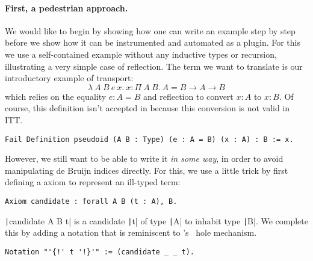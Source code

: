 \paragraph{First, a pedestrian approach.}
%
We would like to begin by showing how one can write an example step by step
before we show how it can be instrumented and automated as a plugin.
For this we use a self-contained example without any inductive
types or recursion, illustrating a very simple case of reflection.
The term we want to translate is our introductory example of transport:
\[
  \lambda\ A\ B\ e\ x.\ x : \Pi\ A\ B.\ A = B \to
  A \to B
\]
which relies on the equality $e : A = B$ and reflection to convert $x
: A$ to $x : B$.
%
Of course, this definition isn't accepted in \Coq because this
conversion is not valid in ITT.
%
\begin{verbatim}
Fail Definition pseudoid (A B : Type) (e : A = B) (x : A) : B := x.
\end{verbatim}
%
However, we still want to be able to write it \emph{in some way}, in order to
avoid manipulating de Bruijn indices directly.
For this, we use a little trick by first defining a \Coq axiom to represent
an ill-typed term:
%
\begin{verbatim}
Axiom candidate : forall A B (t : A), B.
\end{verbatim}
%
\texttt|candidate A B t| is a candidate \texttt|t| of type
\texttt|A| to inhabit type \texttt|B|.
We complete this by adding a notation that is reminiscent to
\Agda's~\cite{norell2007towards} hole mechanism.
%
\begin{verbatim}
Notation "'{!' t '!}'" := (candidate _ _ t).
\end{verbatim}

